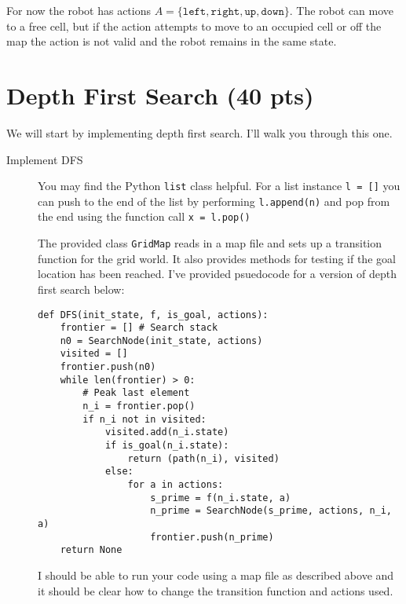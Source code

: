 \documentclass[11pt]{hermans-hw}
\begin{document}
For now the robot has actions \(A = \{\texttt{left}, \texttt{right}, \texttt{up}, \texttt{down}\}\). The robot can move to a free cell, but if the action attempts to move to an occupied cell or off the map the action is not valid and the robot remains in the same state.

\section{Depth First Search (40 pts)}
We will start by implementing depth first search. I'll walk you through this one.
\begin{description}
\item[Implement DFS] You may find the Python \texttt{list} class helpful. For a list instance \texttt{l = []} you can push to the end of the list by performing \texttt{l.append(n)} and pop from the end using the function call \texttt{x = l.pop()}

The provided class \texttt{GridMap} reads in a map file and sets up a transition function for the grid world. It also provides methods for testing if the goal location has been reached. I've provided psuedocode for a version of depth first search below:

\begin{verbatim}
def DFS(init_state, f, is_goal, actions):
    frontier = [] # Search stack
    n0 = SearchNode(init_state, actions)
    visited = []
    frontier.push(n0)
    while len(frontier) > 0:
        # Peak last element
        n_i = frontier.pop()
        if n_i not in visited:
            visited.add(n_i.state)
            if is_goal(n_i.state):
                return (path(n_i), visited)
            else:
                for a in actions:
                    s_prime = f(n_i.state, a)
                    n_prime = SearchNode(s_prime, actions, n_i, a)
                    frontier.push(n_prime)
    return None

\end{verbatim}

I should be able to run your code using a map file as described above and it should be clear how to change the transition function and actions used.


\end{description}
\end{document}
